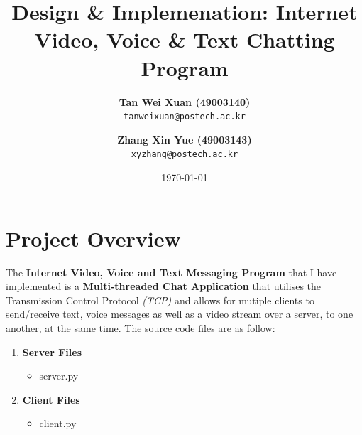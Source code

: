 \documentclass[a4paper,11pt]{article}
\begin{document}
\title{\vspace{-1.0cm}\textbf{Design \& Implemenation: \linebreak Internet Video, Voice \& Text Chatting Program}}
\author{
  \textbf{Tan Wei Xuan (49003140)}\\
  \texttt{tanweixuan@postech.ac.kr}
  \and
   \textbf{Zhang Xin Yue (49003143)}\\
  \texttt{xyzhang@postech.ac.kr}
}
\date{\today}
\maketitle

\section{Project Overview}
The\textbf{ Internet Video, Voice and Text Messaging Program} that I have implemented is a \textbf{Multi-threaded Chat Application} that utilises the Transmission Control Protocol \textit{(TCP)} and allows for mutiple clients to send/receive text, voice messages as well as a video stream over a server, to one another, at the same time. The source code files are as follow:
\begin{enumerate}
	\item \textbf{Server Files}
\begin{itemize}
  	\item server.py
\end{itemize}
	\item \textbf{Client Files}
\begin{itemize}
  	\item client.py
\end{itemize}
\end{enumerate}
\end{document}
